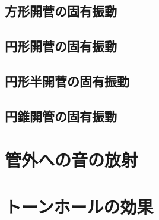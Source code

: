\documentclass[a4paper,uplatex,dvipdfmx]{jsarticle}
\begin{document}
\subsection{方形開菅の固有振動}

\subsection{円形開菅の固有振動}

\subsection{円形半開菅の固有振動}

\subsection{円錐開管の固有振動}


\section{管外への音の放射}


\section{トーンホールの効果}
\end{document}
